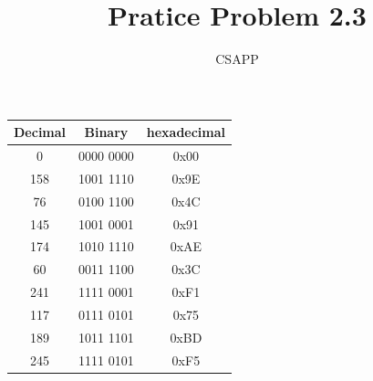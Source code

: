 \documentclass{article}
\title{Pratice Problem 2.3}
\author{CSAPP}
\begin{document}
    \maketitle
    \begin{tabular}{ccc}
        \textbf{Decimal} & \textbf{Binary} & \textbf{hexadecimal}\\
        \midrule
        0   & 0000 0000 & 0x00\\
        158 & 1001 1110 & 0x9E\\
        76  & 0100 1100 & 0x4C\\
        145 & 1001 0001 & 0x91\\
        174 & 1010 1110 & 0xAE\\
        60  & 0011 1100 & 0x3C\\
        241 & 1111 0001 & 0xF1\\
        117 & 0111 0101 & 0x75\\
        189 & 1011 1101 & 0xBD\\
        245 & 1111 0101 & 0xF5\\
    \end{tabular}
\end{document}
